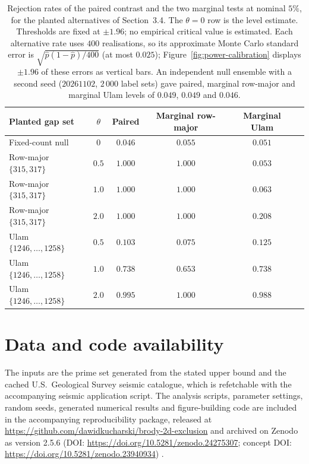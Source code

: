 \documentclass[final,1p,times,authoryear]{elsarticle}
\theoremstyle{definition}
\begin{document}
\begin{table}[htbp]
  \centering
  \caption{Rejection rates of the paired contrast and the two marginal tests
           at nominal $5\%$, for the planted alternatives of
           Section~3.4. The $\theta=0$ row is the level estimate. Thresholds
           are fixed at $\pm1.96$; no empirical critical value is estimated.
           Each alternative rate uses $400$ realisations, so its approximate
           Monte Carlo standard error is $\sqrt{\hat p(1-\hat p)/400}$ (at
           most $0.025$); Figure~\ref{fig:power-calibration} displays
           $\pm1.96$ of these errors as vertical bars. An independent null
           ensemble with a second seed ($20261102$, $2\,000$ label sets) gave
           paired, marginal row-major and marginal Ulam levels of $0.049$,
           $0.049$ and $0.046$.}
  \label{tab:power}
  \small
  \begin{tabular}{@{}lccccc@{}}
    \toprule
    Planted gap set & $\theta$ & Paired & Marginal row-major & Marginal Ulam \\
    \midrule
    Fixed-count null & $0$ & $0.046$ & $0.055$ & $0.051$ \\
    \midrule
    Row-major $\{315,317\}$ & $0.5$ & $1.000$ & $1.000$ & $0.053$ \\
    Row-major $\{315,317\}$ & $1.0$ & $1.000$ & $1.000$ & $0.063$ \\
    Row-major $\{315,317\}$ & $2.0$ & $1.000$ & $1.000$ & $0.208$ \\
    \midrule
    Ulam $\{1246,\ldots,1258\}$ & $0.5$ & $0.103$ & $0.075$ & $0.125$ \\
    Ulam $\{1246,\ldots,1258\}$ & $1.0$ & $0.738$ & $0.653$ & $0.738$ \\
    Ulam $\{1246,\ldots,1258\}$ & $2.0$ & $0.995$ & $1.000$ & $0.988$ \\
    \bottomrule
  \end{tabular}
\end{table}

\clearpage
\section*{Data and code availability}
The inputs are the prime set generated from the stated upper bound and the
cached U.S.~Geological Survey seismic catalogue, which is refetchable with
the accompanying seismic application script. The analysis scripts, parameter
settings, random seeds, generated numerical results and figure-building code
are included in the accompanying reproducibility package, released at
\url{https://github.com/dawidkucharski/brody-2d-exclusion} and archived on
Zenodo as version 2.5.6 (DOI: \url{https://doi.org/10.5281/zenodo.24275307};
concept DOI: \url{https://doi.org/10.5281/zenodo.23940934})
\citep{KUCHARSKI-2026-CODE}.
\end{document}
